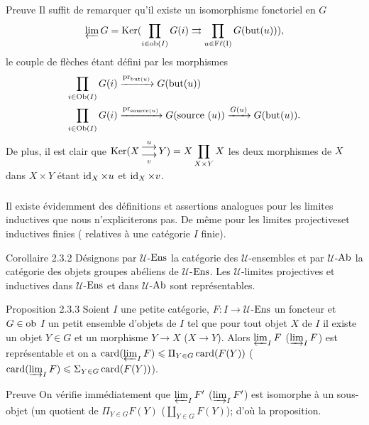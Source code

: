 \documentclass[10pt]{../fichiers-configuration-latex/smfart}
\begin{document}
\begin{enonce*}[remark]{Preuve}
Il suffit de remarquer qu'il existe un isomorphisme fonctoriel en
$G$
$$
\varprojlim G=\Ker (\prod_{i\in \ob(I)} %
G(i)\rightrightarrows \prod_{u\in \rm{F\ell}(I)} G(\but(u))){\quoi},
$$
le couple de flèches étant défini par les morphismes
\begin{align*}
\prod_{i\in \Ob(I)}  G(i) %
 & \xrightarrow{\pr_{\but(u)}}{} G(\but(u))\\
\prod_{i\in \Ob(I)} G(i) %
 &\xrightarrow{\pr_{\text{source}(u)}}{} G(\text{source
}(u))\xrightarrow{G(u)} G(\but(u)){\quoi}.
\end{align*}
De plus, il est clair que $\Ker (X  \displaystyle \Lright^{u}_{v}Y)=
X\prod_{X\times Y} X$ les deux morphismes de $X$ dans $X\times Y$
étant $\operatorname{id}_X \times u$ et $\operatorname{id}_X\times v$.
\end{enonce*}

\setcounter{subsection}{3} \setcounter{subsubsection}{0}
\subsubsection{}
Il existe évidemment des définitions et assertions analogues pour
les limites inductives que nous n'expliciterons pas. De même pour
les limites projectives\pageoriginale et inductives finies (\ie
relatives à une %
catégorie $I$ finie).


\begin{enonce*}{Corollaire 2.3.2}
Désignons par $𝒰$-$\operatorname{Ens}$ la catégorie des
$𝒰$-ensembles et par $𝒰$-$\operatorname{Ab}$ la catégorie des
objets groupes abéliens de $𝒰$-$\operatorname{Ens}$. Les
$𝒰$-limites projectives et inductives dans
$𝒰$-$\operatorname{Ens}$ et dans $𝒰$-$\operatorname{Ab}$ sont représentables.
\end{enonce*}

\begin{enonce*}{Proposition 2.3.3}
Soient $I$ une petite catégorie, $F:I\rightarrow 𝒰$-$\operatorname{Ens}$
un foncteur et \linebreak %
$G\in\operatorname{ob}$ $I$ un petit ensemble d'objets de $I$ tel que pour tout
objet $X$ de $I$ il existe un objet $Y\in G$ et un morphisme
$Y\rightarrow X$ (\resp  $X\rightarrow Y$). Alors $\varprojlim_I F$
(\resp  $\varinjlim_I F$) est représentable et on a
$\operatorname{card}(\varprojlim_I F)\leqslant \Pi_{Y\in G}\operatorname{card}(F(Y))$ (\resp
$\operatorname{card}(\varinjlim_I F)\leqslant \Sigma_{Y\in G}\operatorname{card}(F(Y))$).
\end{enonce*}

\begin{enonce*}[remark]{Preuve}
On vérifie immédiatement que $\varprojlim_I F'$ (\resp $\varinjlim_I
F'$) est isomorphe à un sous-objet (\resp  un quotient de $\Pi_{Y\in
G}F(Y)$ (\resp  $\amalg_{Y\in G}F(Y)$); d'où la proposition.
\end{enonce*}
\end{document}
